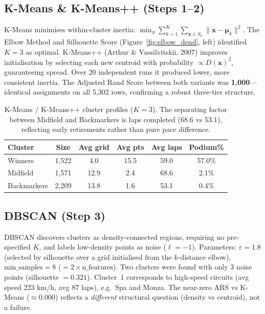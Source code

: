 \documentclass[11pt,a4paper]{article}
\begin{document}
\subsection{K-Means \& K-Means++ (Steps 1--2)}

K-Means minimises within-cluster inertia:
$\min_S \sum_{k=1}^{K}\sum_{\mathbf{x}\in S_k}\|\mathbf{x}-\boldsymbol{\mu}_k\|^2$.
The Elbow Method and Silhouette Score (Figure~\ref{fig:elbow_dend}, left)
identified $K=3$ as optimal. K-Means++ (Arthur \& Vassilvitskii, 2007) improves
initialisation by selecting each new centroid with probability $\propto D(\mathbf{x})^2$,
guaranteeing spread. Over 20 independent runs it produced lower, more consistent
inertia. The Adjusted Rand Score between both variants was \textbf{1.000}---identical
assignments on all 5,302 rows, confirming a robust three-tier structure.

\begin{table}[H]
\centering\small\renewcommand{\arraystretch}{1.2}
\begin{tabular}{lccccc}
\toprule
\textbf{Cluster} & \textbf{Size} & \textbf{Avg grid} & \textbf{Avg pts} & \textbf{Avg laps} & \textbf{Podium\%} \\
\midrule
\rowcolor{lightgray}
Winners     & 1{,}522 & 4.0  & 15.5 & 59.0 & 57.0\% \\
Midfield    & 1{,}571 & 12.9 &  2.4 & 68.6 &  2.1\% \\
Backmarkers & 2{,}209 & 13.8 &  1.6 & 53.1 &  0.4\% \\
\bottomrule
\end{tabular}
\caption{K-Means / K-Means++ cluster profiles ($K=3$). The separating factor
between Midfield and Backmarkers is laps completed (68.6 vs 53.1),
reflecting early retirements rather than pure pace difference.}
\end{table}

\subsection{DBSCAN (Step 3)}

DBSCAN discovers clusters as density-connected regions, requiring no pre-specified
$K$, and labels low-density points as noise ($\ell=-1$). Parameters:
$\varepsilon=1.8$ (selected by silhouette over a grid initialised from the
$k$-distance elbow), $\text{min\_samples}=8$ ($= 2\times\text{n\_features}$).
Two clusters were found with only 3 noise points (silhouette $= 0.321$).
Cluster~1 corresponds to high-speed circuits (avg speed 223 km/h, avg 87 laps),
e.g.\ Spa and Monza. The near-zero ARS vs K-Means ($\approx 0.000$) reflects a
\textit{different} structural question (density vs centroid), not a failure.
\end{document}
